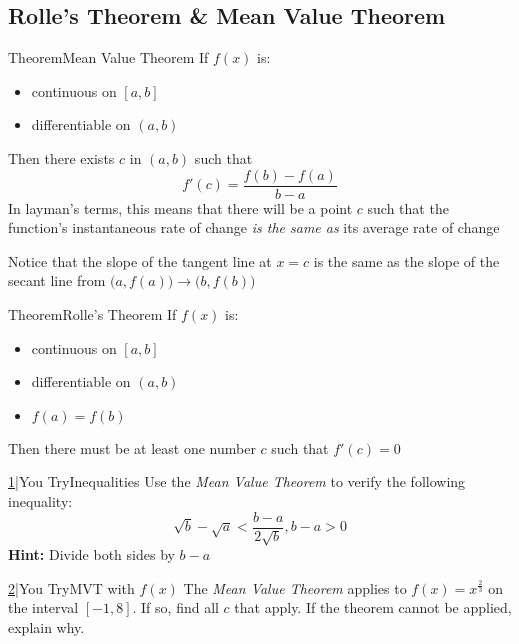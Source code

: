 \documentclass{MathNotes}
\newenvironment{theorem}[1]{\begin{GrayBox}{Theorem}{#1}}{\end{GrayBox}}
\newenvironment{practice}[2]{\begin{PurpleBox}{\texorpdfstring{#1}\Big|You Try}{#2}}{\end{PurpleBox}}
\begin{document}
\newpage
\subsection{Rolle's Theorem \& Mean Value Theorem}\label{sec:rolles-and-mvt}
\begin{multicols}{2}
    \begin{theorem}{Mean Value Theorem}\label{th:mvt}
		If $f(x)$ is:
		\begin{itemize}
			\item continuous on $[a, b]$
			\item differentiable on $(a, b)$
		\end{itemize}
		Then there exists $c$ in $(a, b)$ such that
		$$f'(c)=\frac{f(b)-f(a)}{b - a}$$ In layman's terms, this
		means that there will be a point $c$ such that the function's instantaneous
		rate of change \textit{ is the same as} its average rate of change
	\end{theorem}

	\begin{center}
		
	\end{center}

	Notice that the slope of the tangent line at $x=c$ is the same as the slope
	of the secant line from $\big(a, f(a)\big)\to\big(b,f(b)\big)$
\end{multicols}
\begin{multicols}{2}
	\begin{center}
		
	\end{center}
    \begin{theorem}{Rolle's Theorem}\label{th:rolles-theorem}
		If $f(x)$ is:
		\begin{itemize}
			\item continuous on $[a, b]$
			\item differentiable on $(a, b)$
			\item $f(a)=f(b)$
		\end{itemize}
		Then there must be at least one number $c$ such that $f'(c)=0$
	\end{theorem}
\end{multicols}
\begin{multicols}{2}
	\begin{practice}{\hyperref[ans:inequalities]{1}}{Inequalities}\label{prac:inequalities}
		Use the \textit{Mean Value Theorem} to verify the following inequality:
        \[\sqrt{b}-\sqrt{a}<\frac{b-a}{2\sqrt{b}},b-a>0\]
		\textbf{Hint:} Divide both sides by $b-a$
	\end{practice}

    \begin{practice}{\hyperref[ans:mvt]{2}}{MVT with $f(x)$}\label{prac:mvt}
		The \textit{Mean Value Theorem} applies to $f(x)=x^{\frac{2}{3}}$ on the
		interval $[-1, 8]$. If so, find all $c$ that apply. If the theorem cannot
		be applied, explain why.
	\end{practice}
\end{multicols}
\end{document}
